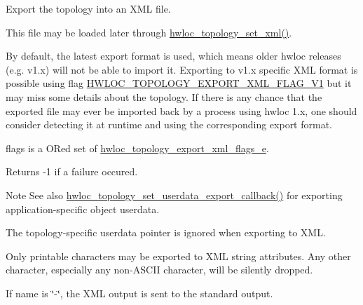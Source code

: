 Export the topology into an X\+ML file. 

This file may be loaded later through \hyperlink{a00192_ga879439b7ee99407ee911b3ac64e9a25e}{hwloc\+\_\+topology\+\_\+set\+\_\+xml()}.

By default, the latest export format is used, which means older hwloc releases (e.\+g. v1.\+x) will not be able to import it. Exporting to v1.\+x specific X\+ML format is possible using flag \hyperlink{a00206_gga0eb99636aff71fe2704e1fa0ffe8c18dae7d6d96546131ef0043867b836b02e0f}{H\+W\+L\+O\+C\+\_\+\+T\+O\+P\+O\+L\+O\+G\+Y\+\_\+\+E\+X\+P\+O\+R\+T\+\_\+\+X\+M\+L\+\_\+\+F\+L\+A\+G\+\_\+\+V1} but it may miss some details about the topology. If there is any chance that the exported file may ever be imported back by a process using hwloc 1.\+x, one should consider detecting it at runtime and using the corresponding export format.

{\ttfamily flags} is a OR\textquotesingle{}ed set of \hyperlink{a00206_ga0eb99636aff71fe2704e1fa0ffe8c18d}{hwloc\+\_\+topology\+\_\+export\+\_\+xml\+\_\+flags\+\_\+e}.

\begin{DoxyReturn}{Returns}
-\/1 if a failure occured.
\end{DoxyReturn}
\begin{DoxyNote}{Note}
See also \hyperlink{a00206_ga9d6ff0f7a8dd45be9aa8575ef31978cc}{hwloc\+\_\+topology\+\_\+set\+\_\+userdata\+\_\+export\+\_\+callback()} for exporting application-\/specific object userdata.

The topology-\/specific userdata pointer is ignored when exporting to X\+ML.

Only printable characters may be exported to X\+ML string attributes. Any other character, especially any non-\/\+A\+S\+C\+II character, will be silently dropped.

If {\ttfamily name} is \char`\"{}-\/\char`\"{}, the X\+ML output is sent to the standard output. 
\end{DoxyNote}
\mbox{\label{a00206_gad33b7f7c11db10459505a3b1634fd3f1}} 
